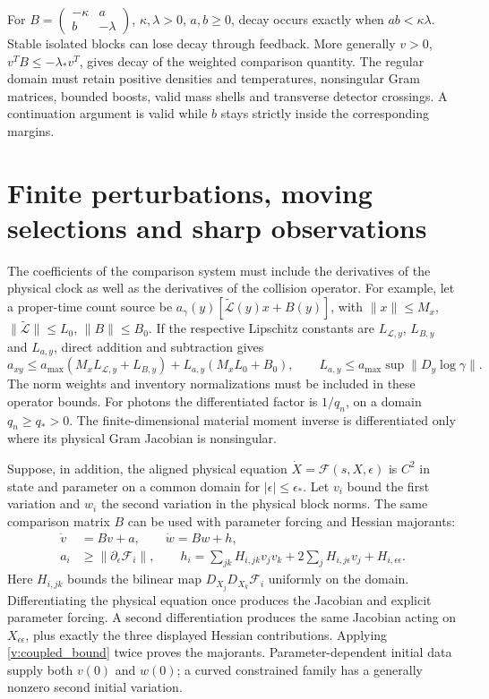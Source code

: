 For $B=\left(\begin{smallmatrix}-\kappa&a\\b&-\lambda\end{smallmatrix}\right)$, $\kappa,\lambda>0$, $a,b\ge0$, decay occurs exactly when $ab<\kappa\lambda$. Stable isolated blocks can lose decay through feedback. More generally $v>0$, $v^TB\le-\lambda_*v^T$, gives decay of the weighted comparison quantity. The regular domain must retain positive densities and temperatures, nonsingular Gram matrices, bounded boosts, valid mass shells and transverse detector crossings. A continuation argument is valid while $b$ stays strictly inside the corresponding margins.


\section{Finite perturbations, moving selections and sharp observations}
\label{v:finite_perturbation}

The coefficients of the comparison system must include the derivatives of the physical clock as well as the derivatives of the collision operator. For example, let a proper-time count source be $a_\gamma(y)[\widetilde{\mathcal L}(y)x+B(y)]$, with
$\|x\|\le M_x$, $\|\widetilde{\mathcal L}\|\le L_0$, $\|B\|\le B_0$.
If the respective Lipschitz constants are $L_{\mathcal L,y}$, $L_{B,y}$ and $L_{a,y}$, direct addition and subtraction gives
\begin{equation}
 a_{xy}\le a_{\max}(M_xL_{\mathcal L,y}+L_{B,y})
 +L_{a,y}(M_xL_0+B_0),\qquad
 L_{a,y}\le a_{\max}\sup\|D_y\log\gamma\|.
 \label{v:clock_lipschitz}
\end{equation}
The norm weights and inventory normalizations must be included in these operator bounds. For photons the differentiated factor is $1/q_n$, on a domain $q_n\ge q_*>0$. The finite-dimensional material moment inverse is differentiated only where its physical Gram Jacobian is nonsingular.

Suppose, in addition, the aligned physical equation $\dot X=\mathcal F(s,X,\epsilon)$ is $C^2$ in state and parameter on a common domain for $|\epsilon|\le\epsilon_*$. Let $v_i$ bound the first variation and $w_i$ the second variation in the physical block norms. The same comparison matrix $B$ can be used with parameter forcing and Hessian majorants:
\begin{align}
 \dot v&=Bv+a,\qquad \dot w=Bw+h,\nonumber\\
 a_i&\ge\|\partial_\epsilon\mathcal F_i\|,\qquad
 h_i=\sum_{jk}H_{i,jk}v_jv_k+
 2\sum_jH_{i,j\epsilon}v_j+H_{i,\epsilon\epsilon}.
 \label{v:second_variation}
\end{align}
Here $H_{i,jk}$ bounds the bilinear map
$D_{X_j}D_{X_k}\mathcal F_i$ uniformly on the domain. Differentiating the physical equation once produces the Jacobian and explicit parameter forcing. A second differentiation produces the same Jacobian acting on $X_{\epsilon\epsilon}$, plus exactly the three displayed Hessian contributions. Applying \eqref{v:coupled_bound} twice proves the majorants. Parameter-dependent initial data supply both $v(0)$ and $w(0)$; a curved constrained family has a generally nonzero second initial variation.

